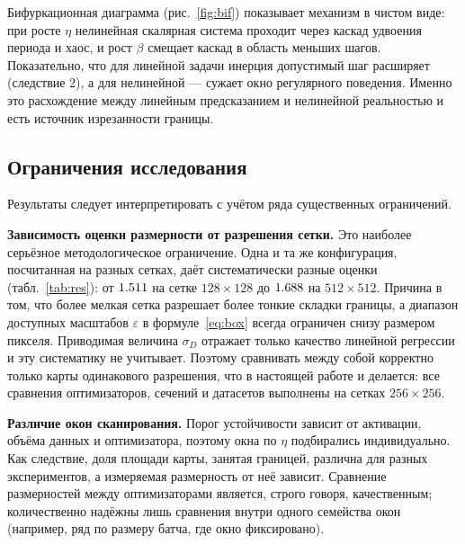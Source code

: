 Бифуркационная диаграмма (рис.~\ref{fig:bif}) показывает механизм в чистом
виде: при росте $\eta$ нелинейная скалярная система проходит через каскад
удвоения периода и хаос, и рост $\beta$ смещает каскад в область меньших
шагов. Показательно, что для линейной задачи инерция допустимый шаг
расширяет (следствие 2), а для нелинейной --- сужает окно регулярного
поведения. Именно это расхождение между линейным предсказанием и нелинейной
реальностью и есть источник изрезанности границы.

\subsection{Ограничения исследования}\label{sec:limitations}

Результаты следует интерпретировать с учётом ряда существенных ограничений.

\textbf{Зависимость оценки размерности от разрешения сетки.} Это наиболее
серьёзное методологическое ограничение. Одна и та же конфигурация, посчитанная
на разных сетках, даёт систематически разные оценки (табл.~\ref{tab:res}):
от $1.511$ на сетке $128\times128$ до $1.688$ на $512\times512$.
Причина в том, что более мелкая сетка разрешает более тонкие складки границы,
а диапазон доступных масштабов $\varepsilon$ в формуле~\eqref{eq:box} всегда
ограничен снизу размером пикселя. Приводимая величина $\sigma_D$ отражает
только качество линейной регрессии и эту систематику не учитывает. Поэтому
сравнивать между собой корректно только карты одинакового разрешения, что
в настоящей работе и делается: все сравнения оптимизаторов, сечений и
датасетов выполнены на сетках $256\times256$.

\begin{table}[htbp]
  \centering
  \caption{Зависимость оценки размерности от разрешения сетки для одной и той
  же конфигурации (tanh, $(\eta_0,\eta_1)$, $|\mathcal{D}|=1$).}
  \label{tab:res}
  \small
  
\end{table}

\textbf{Различие окон сканирования.} Порог устойчивости зависит от активации,
объёма данных и оптимизатора, поэтому окна по $\eta$ подбирались
индивидуально. Как следствие, доля площади карты, занятая границей, различна
для разных экспериментов, а измеряемая размерность от неё зависит. Сравнение
размерностей между оптимизаторами является, строго говоря, качественным;
количественно надёжны лишь сравнения внутри одного семейства окон
(например, ряд по размеру батча, где окно фиксировано).

